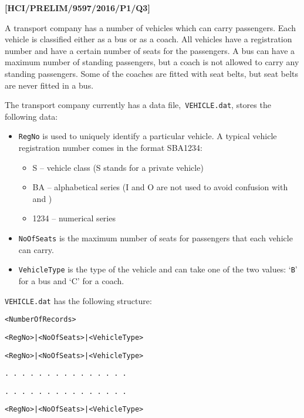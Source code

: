\item \textbf{{[}HCI/PRELIM/9597/2016/P1/Q3{]} }

A transport company has a number of vehicles which can carry passengers.
Each vehicle is classified either as a bus or as a coach. All vehicles
have a registration number and have a certain number of seats for
the passengers. A bus can have a maximum number of standing passengers,
but a coach is not allowed to carry any standing passengers. Some
of the coaches are fitted with seat belts, but seat belts are never
fitted in a bus.

The transport company currently has a data file,\texttt{ VEHICLE.dat},
stores the following data:
\begin{itemize}
\item \texttt{RegNo} is used to uniquely identify a particular vehicle.
A typical vehicle registration number comes in the format \textquotedbl SBA1234\textquotedbl :
\begin{itemize}
\item S -- vehicle class (\textquotedbl S\textquotedbl{} stands for a
private vehicle) 
\item BA -- alphabetical series (\textquotedbl I\textquotedbl{} and \textquotedbl O\textquotedbl{}
are not used to avoid confusion with \textquotedbl{}
and \textquotedbl ) 
\item 1234 -- numerical series 
\end{itemize}
\item \texttt{NoOfSeats} is the maximum number of seats for passengers that
each vehicle can carry. 
\item \texttt{VehicleType} is the type of the vehicle and can take one of
the two values: \textquoteleft \texttt{B}\textquoteright{} for a bus
and \textquoteleft C\textquoteright{} for a coach. 
\end{itemize}
\texttt{VEHICLE.dat} has the following structure: 

\noindent %
\noindent\begin{minipage}[t]{1\columnwidth}%
\texttt{<NumberOfRecords>}

\texttt{<RegNo>|<NoOfSeats>|<VehicleType> }

\texttt{<RegNo>|<NoOfSeats>|<VehicleType> }

\texttt{. . . . . . . . . . . . . . . }

\texttt{. . . . . . . . . . . . . . . }

\texttt{<RegNo>|<NoOfSeats>|<VehicleType> }%
\end{minipage}

